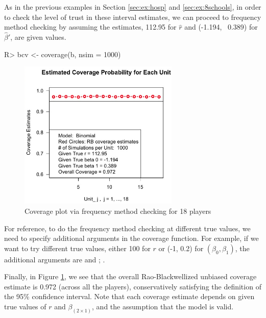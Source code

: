 \documentclass[article]{jss}
\begin{document}
As in the previous examples in Section \ref{sec:ex:hosp} and \ref{sec:ex:8schools}, in order to check the level of trust in these interval estimates, we can proceed to frequency method checking by assuming the estimates, 112.95 for $\hat{r}$ and (-1.194, ~0.389) for $\hat{\beta}'$, are given values. 

\begin{CodeChunk}
\begin{CodeInput}
R> bcv <- coverage(b, nsim = 1000) 
\end{CodeInput}
\end{CodeChunk}
\begin{figure}[h]
\begin{center}
\includegraphics[width = 3in]{baseball2.png}
\caption{Coverage plot via frequency method checking for 18 players}
\label{fig:baseball2}
\end{center}
\end{figure}

For reference, to do the frequency method checking at different true values, we need to specify additional arguments in the coverage function. For example, if we want to try different true values, either 100 for $r$ or (-1, 0.2) for $(\beta_{0}, \beta_{1})$, the additional arguments are  and ; .


Finally, in Figure \ref{fig:baseball2}, we see that the overall Rao-Blackwellized unbiased coverage estimate is 0.972 (across all the players), conservatively satisfying the definition of the 95\% confidence interval. Note that each coverage estimate depends on given true values of $r$ and $\beta_{(2\times1)}$, and the assumption that the model is valid.
\end{document}
